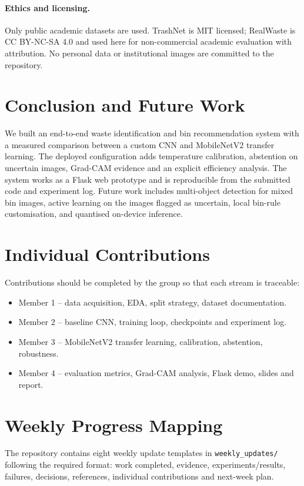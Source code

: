 \documentclass[11pt,a4paper]{article}
\begin{document}
\paragraph{Ethics and licensing.} Only public academic datasets are used. TrashNet is MIT
licensed; RealWaste is CC BY-NC-SA 4.0 and used here for non-commercial academic evaluation
with attribution. No personal data or institutional images are committed to the repository.

\section{Conclusion and Future Work}
\label{sec:conclusion}

We built an end-to-end waste identification and bin recommendation system with a measured
comparison between a custom CNN and MobileNetV2 transfer learning. The deployed
configuration adds temperature calibration, abstention on uncertain images, Grad-CAM
evidence and an explicit efficiency analysis. The system works as a Flask web prototype
and is reproducible from the submitted code and experiment log. Future work includes
multi-object detection for mixed bin images, active learning on the images flagged as
uncertain, local bin-rule customisation, and quantised on-device inference.

\appendix
\section{Individual Contributions}
Contributions should be completed by the group so that each stream is traceable:
\begin{itemize}
  \item Member 1 -- data acquisition, EDA, split strategy, dataset documentation.
  \item Member 2 -- baseline CNN, training loop, checkpoints and experiment log.
  \item Member 3 -- MobileNetV2 transfer learning, calibration, abstention, robustness.
  \item Member 4 -- evaluation metrics, Grad-CAM analysis, Flask demo, slides and report.
\end{itemize}

\section{Weekly Progress Mapping}
The repository contains eight weekly update templates in \texttt{weekly\_updates/} following
the required format: work completed, evidence, experiments/results, failures, decisions,
references, individual contributions and next-week plan.
\end{document}

